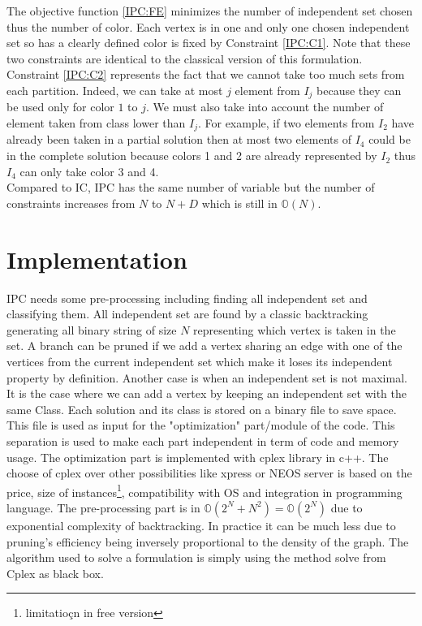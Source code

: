 The objective function \ref{IPC:FE} minimizes the number of independent set chosen thus the number of color. Each vertex is in one and only one chosen independent set so has a clearly defined color is fixed by Constraint \ref{IPC:C1}. Note that these two constraints are identical to the classical version of this formulation. Constraint \ref{IPC:C2} represents the fact that we cannot take too much sets from each partition. Indeed, we can take at most $j$ element from $I_j$ because they can be used only for color $1$ to $j$. We must also take into account the number of element taken from class lower than $I_j$. For example, if two elements from $I_2$ have already been taken in a partial solution then at most two elements of $I_4$ could be in the complete solution because colors 1 and 2 are already represented by $I_2$ thus $I_4$ can only take color 3 and 4.\\

Compared to IC, IPC has the same number of variable but the number of constraints increases from $N$ to $N+D$ which is still in $\mathbb{O}(N)$.

\section{Implementation}
\label{sec:Stableimpl}

IPC needs some pre-processing including finding all independent set and classifying them. All independent set are found by a classic backtracking generating all binary string of size $N$ representing which vertex is taken in the set. A branch can be pruned if we add a vertex sharing an edge with one of the vertices from the current independent set which make it loses its independent property by definition. Another case is when an independent set is not maximal. It is the case where we can add a vertex by keeping an independent set with the same Class. Each solution and its class is stored on a binary file to save space. This file is used as input for the "optimization" part/module of the code. This separation is used to make each part independent in term of code and memory usage. The optimization part is implemented with cplex library in c++. The choose of cplex over other possibilities like xpress or NEOS server is based on the price, size of instances\footnote{limitatioçn in free version}, compatibility with OS and integration in programming language. The pre-processing part is in $\mathbb{O}(2^N + N^2) = \mathbb{O}(2^N) $ due to exponential complexity of backtracking. In practice it can be much less due to pruning's efficiency being inversely proportional to the density of the graph. The algorithm used to solve a formulation is simply using the method solve from Cplex as black box. \\

